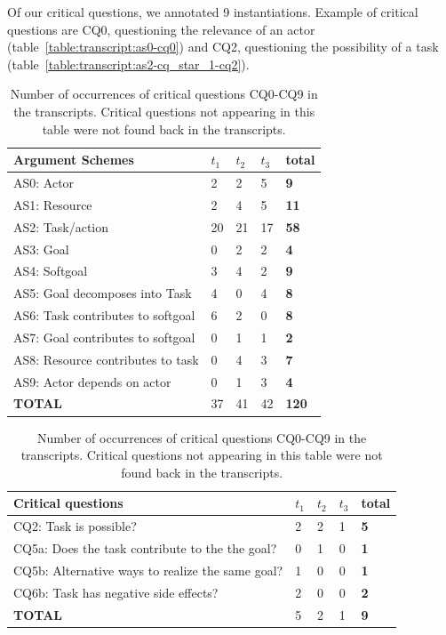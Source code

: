 \documentclass[11.5pt,two column]{llncs}
\begin{document}
Of our critical questions, we annotated 9 instantiations. Example of critical questions are CQ0, questioning the relevance of an actor (table~\ref{table:transcript:as0-cq0}) and CQ2, questioning the possibility of a task (table~\ref{table:transcript:as2-cq_star_1-cq2}).

\begin{table}[ht]
\centering
\begin{tabular}{|l|l|l|l|>{\bfseries}l|}
\hline
\textbf{Argument Schemes} & $t_1$ & $t_2$ & $t_3$ & \textbf{total}\\
\hline 
AS0: Actor & 2 & 2 & 5 & 9\\
\hline
AS1: Resource & 2 & 4 & 5 & 11\\
\hline
AS2: Task/action & 20 & 21 & 17 & 58\\
\hline
AS3: Goal & 0 & 2 & 2 & 4\\
\hline
AS4: Softgoal & 3 & 4 & 2 & 9\\
\hline
AS5: Goal decomposes into Task & 4 &0& 4 & 8\\
\hline
AS6: Task contributes to softgoal & 6 & 2 &0& 8\\
\hline
AS7: Goal contributes to softgoal &0& 1 & 1 & 2\\
\hline
AS8: Resource contributes to task & 0 & 4 & 3 & 7\\
\hline
AS9: Actor depends on actor &0& 1 & 3 & 4\\
\hline
\hline
\textbf{TOTAL} & 37& 41 & 42 & 120\\
\hline
\end{tabular}
\caption{Number of occurrences of AS0-AS9 in the transcripts.}
\label{table:transcripts:results:argumentschemes}

\begin{tabular}{|l|l|l|l|>{\bfseries}l|}
\hline
\textbf{Critical questions} & $t_1$ & $t_2$ & $t_3$ & \textbf{total}\\
\hline 			
CQ2: Task is possible? & 2 & 2 & 1 & 5\\
\hline		
CQ5a: Does the task contribute to the the goal? & 0 & 1 & 0 & 1\\
\hline
CQ5b: Alternative ways to realize the same goal? & 1 & 0 & 0 & 1\\
\hline
CQ6b: Task has negative side effects? & 2 & 0 & 0 & 2\\
\hline
\hline
\textbf{TOTAL} & 5 & 2 & 1 & 9\\
\hline
\end{tabular}
\caption{Number of occurrences of critical questions CQ0-CQ9 in the transcripts. Critical questions not appearing in this table were not found back in the transcripts.}
\label{table:transcripts:results:criticalquestions}
\end{table}
\end{document}
